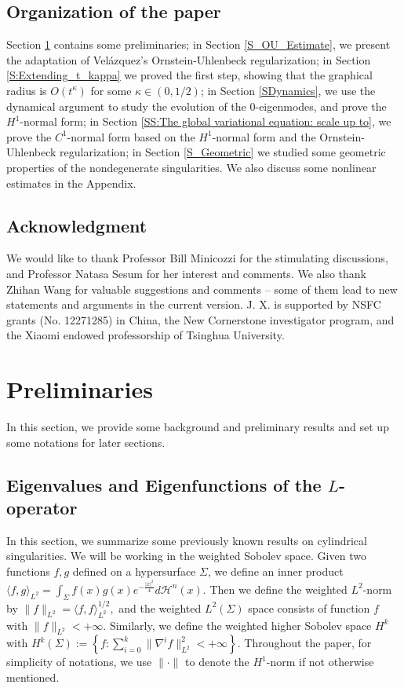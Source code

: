 \documentclass[11pt]{amsart}
\numberwithin{equation}{section}
\numberwithin{equation}{section}
\newcommand{\cH}{\mathcal{H}}
\begin{document}
	
	
	\subsection{Organization of the paper}
	Section \ref{S_preliminaries} contains some preliminaries; in Section \ref{S_OU_Estimate}, we present the adaptation of Vel\'azquez's Ornstein-Uhlenbeck regularization; in Section \ref{S:Extending_t_kappa} we proved the first step, showing that the graphical radius is $O(t^\kappa)$ for some $\kappa\in(0,1/2)$; in Section \ref{SDynamics}, we use the dynamical argument to study the evolution of the $0$-eigenmodes, and prove the $H^1$-normal form; in Section \ref{SS:The global variational equation: scale up to}, we prove the $C^1$-normal form based on the $H^1$-normal form and the Ornstein-Uhlenbeck regularization; in Section \ref{S_Geometric} we studied some geometric properties of the nondegenerate singularities. We also discuss some nonlinear estimates in the Appendix.
	
	
	
	\subsection*{Acknowledgment}
	We would like to thank Professor Bill Minicozzi for the stimulating discussions, and Professor Natasa Sesum for her interest and comments. We also thank Zhihan Wang for valuable suggestions and comments -- some of them lead to new statements and arguments in the current version. J. X. is supported by NSFC grants (No. 12271285) in China, the New Cornerstone investigator program, and the Xiaomi endowed professorship of Tsinghua University. 
	
	\section{Preliminaries}\label{S_preliminaries}
	In this section, we provide some background and preliminary results and set up some notations for later sections. 
	
	\subsection{Eigenvalues and Eigenfunctions of the $L$-operator}\label{SPre}
	In this section, we summarize some previously known results on cylindrical singularities. 
	We will be working in the weighted Sobolev space. Given two functions $f,g$ defined on a hypersurface $\Sigma$, we define an inner product
	$
	\langle f,g\rangle_{L^2} =\int_{\Sigma}f(x)g(x)e^{-\frac{|x|^2}{4}}d\cH^n(x).
	$
	Then we define the weighted $L^2$-norm by
	$\|f\|_{L^2}=\langle f,f\rangle_{L^2}^{1/2},$
	and the weighted $L^2(\Sigma)$ space consists of function $f$ with $\|f\|_{L^2}<+\infty$. Similarly, we define the weighted higher Sobolev space $H^{k}$ with
	$
	H^{k}(\Sigma):=\left\{f: \sum_{i=0}^k \|\nabla^i f\|^2_{L^2}<+\infty\right\}.
	$
	Throughout the paper, for simplicity of notations, we use $\|\cdot\|$ to denote the $H^1$-norm if not otherwise mentioned. 
	
\end{document}
